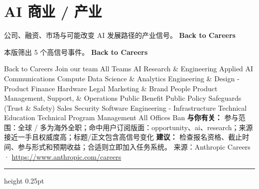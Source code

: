 \documentclass[10.5pt]{ctexart}
\begin{document}
\section*{AI 商业 / 产业}
{\color{ormuted} 公司、融资、市场与可能改变 AI 发展路径的产业信号。}
\vspace{2mm}
{\LARGE\bfseries Back to Careers}\par
\vspace{1mm}
{\color{ormuted} 本版筛出 5 个高信号事件。}
\vspace{3mm}
{\Large\bfseries Back to Careers}\par
Back to Careers Join our team All Teams AI Research \& Engineering Applied AI Communications Compute Data Science \& Analytics Engineering \& Design - Product Finance Hardware Legal Marketing \& Brand People Product Management, Support, \& Operations Public Benefit Public Policy Safeguards (Trust \& Safety) Sales Security Software Engineering - Infrastructure Technical Education Technical Program Management All Offices Ban
\textbf{与你有关：} 参与范围：全球 / 多为海外全职；命中用户订阅版面：opportunity、ai、research；来源接近一手且权威度高；标题/正文包含高信号变化
\textbf{建议：} 检查报名资格、截止时间、参与形式和预期收益；合适则立即加入任务系统。
{\footnotesize\color{ormuted} 来源：Anthropic Careers · \url{https://www.anthropic.com/careers}}
\vspace{4mm}
\hrule height 0.25pt
\vspace{3mm}
\end{document}
